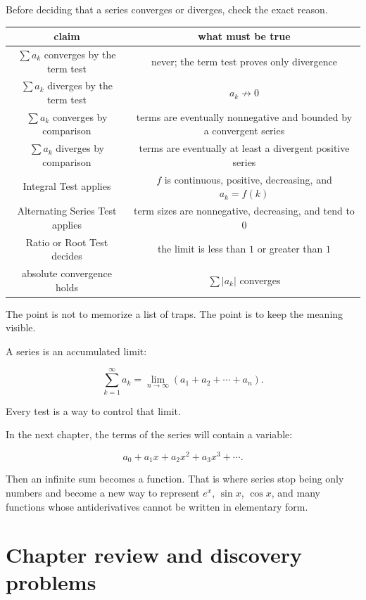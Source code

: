 Before deciding that a series converges or diverges, check the exact reason.

\begin{center}
\begin{tabular}{c|c}
\textbf{claim} & \textbf{what must be true} \\ \hline
\(\sum a_k\) converges by the term test & never; the term test proves only divergence \\[3pt]
\(\sum a_k\) diverges by the term test & \(a_k\not\to0\) \\[3pt]
\(\sum a_k\) converges by comparison & terms are eventually nonnegative and bounded by a convergent series \\[3pt]
\(\sum a_k\) diverges by comparison & terms are eventually at least a divergent positive series \\[3pt]
Integral Test applies & \(f\) is continuous, positive, decreasing, and \(a_k=f(k)\) \\[3pt]
Alternating Series Test applies & term sizes are nonnegative, decreasing, and tend to \(0\) \\[3pt]
Ratio or Root Test decides & the limit is less than \(1\) or greater than \(1\) \\[3pt]
absolute convergence holds & \(\sum |a_k|\) converges
\end{tabular}
\end{center}

The point is not to memorize a list of traps.  The point is to keep the meaning visible.

A series is an accumulated limit:

\[
\sum_{k=1}^{\infty}a_k
=
\lim_{n\to\infty}
(a_1+a_2+\cdots+a_n).
\]

Every test is a way to control that limit.

In the next chapter, the terms of the series will contain a variable:

\[
a_0+a_1x+a_2x^2+a_3x^3+\cdots.
\]

Then an infinite sum becomes a function.  That is where series stop being only numbers
and become a new way to represent \(e^x\), \(\sin x\), \(\cos x\), and many functions
whose antiderivatives cannot be written in elementary form.

\section{Chapter review and discovery problems}
\label{sec:chapter-review-series-discovery-problems}

